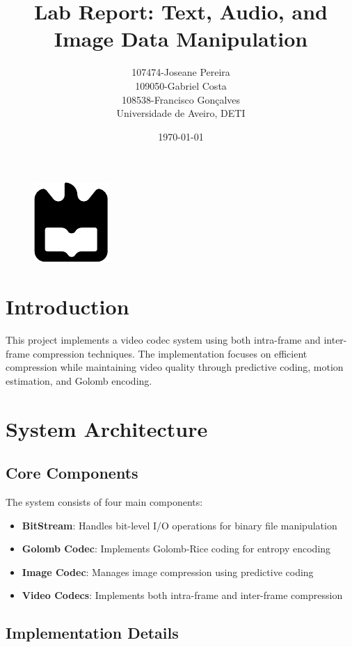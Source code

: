 \documentclass[a4paper,14pt]{article}
\title{Lab Report: Text, Audio, and Image Data Manipulation}
\author{107474-Joseane Pereira \\
109050-Gabriel Costa \\
108538-Francisco Gonçalves \\
Universidade de Aveiro, DETI}
\date{\today}
\begin{document}
\begin{figure}
    \centering
    \includegraphics[width=0.3\linewidth]{ua.pdf}
    \label{fig:enter-label}
\end{figure}
\maketitle
\newpage
\tableofcontents
\newpage

\section{Introduction}
This project implements a video codec system using both intra-frame and inter-frame compression techniques. The implementation focuses on efficient compression while maintaining video quality through predictive coding, motion estimation, and Golomb encoding.

\section{System Architecture}

\subsection{Core Components}
The system consists of four main components:
\begin{itemize}
    \item \textbf{BitStream}: Handles bit-level I/O operations for binary file manipulation
    \item \textbf{Golomb Codec}: Implements Golomb-Rice coding for entropy encoding
    \item \textbf{Image Codec}: Manages image compression using predictive coding
    \item \textbf{Video Codecs}: Implements both intra-frame and inter-frame compression
\end{itemize}

\subsection{Implementation Details}
\end{document}
